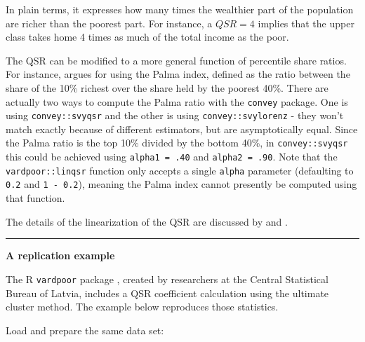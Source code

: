 \documentclass[
]{book}
\begin{document}
In plain terms, it expresses how many times the wealthier part of the population are richer than the poorest part. For instance, a \(QSR = 4\) implies that the upper class takes home 4 times as much of the total income as the poor.

The QSR can be modified to a more general function of percentile share ratios. For instance, \textcite{cobham2015} argues for using the Palma index, defined as the ratio between the share of the 10\% richest over the share held by the poorest 40\%. There are actually two ways to compute the Palma ratio with the \texttt{convey} package. One is using \texttt{convey::svyqsr} and the other is using \texttt{convey::svylorenz} - they won't match exactly because of different estimators, but are asymptotically equal. Since the Palma ratio is the top 10\% divided by the bottom 40\%, in \texttt{convey::svyqsr} this could be achieved using \texttt{alpha1\ =\ .40} and \texttt{alpha2\ =\ .90}. Note that the \texttt{vardpoor::linqsr} function only accepts a single \texttt{alpha} parameter (defaulting to \texttt{0.2} and \texttt{1\ -\ 0.2}), meaning the Palma index cannot presently be computed using that function.

The details of the linearization of the QSR are discussed by \textcite{deville1999} and \textcite{osier2009}.

\begin{center}\rule{0.5\linewidth}{0.5pt}\end{center}

\textbf{A replication example}

The R \texttt{vardpoor} package \autocite{vardpoor}, created by researchers at the Central Statistical Bureau of Latvia, includes a QSR coefficient calculation using the ultimate cluster method. The example below reproduces those statistics.

Load and prepare the same data set:
\end{document}

